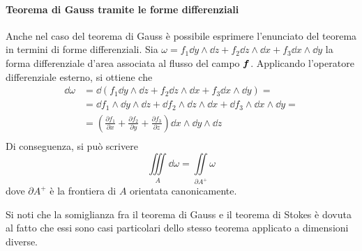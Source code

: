 \paragraph{Teorema di Gauss tramite le forme differenziali}

Anche nel caso del teorema di Gauss è possibile esprimere l'enunciato del teorema in termini di forme differenziali. Sia $\omega = f_1 \dd y \wedge \dd z + f_2 \dd z \wedge \dd x + f_3 \dd x \wedge \dd y$ la forma differenziale d'area associata al flusso del campo $\bm f$. Applicando l'operatore differenziale esterno, si ottiene che
\begin{align*}
	\dd \omega &=\dd(f_1 \dd y \wedge \dd z + f_2 \dd z \wedge \dd x + f_3 \dd x \wedge \dd y)=\\
	&=\dd f_1 \wedge \dd y \wedge \dd z+ \dd f_2\wedge\dd z \wedge \dd x+\dd f_3\wedge \dd x \wedge \dd y=\\
	&= \left(\frac{\partial f_1}{\partial x} + \frac{\partial f_2}{\partial y} + \frac{\partial f_3}{\partial z}\right)\dd x \wedge \dd y \wedge \dd z\\
\end{align*}
Di conseguenza, si può scrivere
$$
	\iiint\limits_A \dd \omega = \iint\limits_{\partial A^+}\omega
$$
dove $\partial A^+$ è la frontiera di $A$ orientata canonicamente.

\begin{remark}
	Si noti che la somiglianza fra il teorema di Gauss e il teorema di Stokes è dovuta al fatto che essi sono casi particolari dello stesso teorema applicato a dimensioni diverse.
\end{remark}